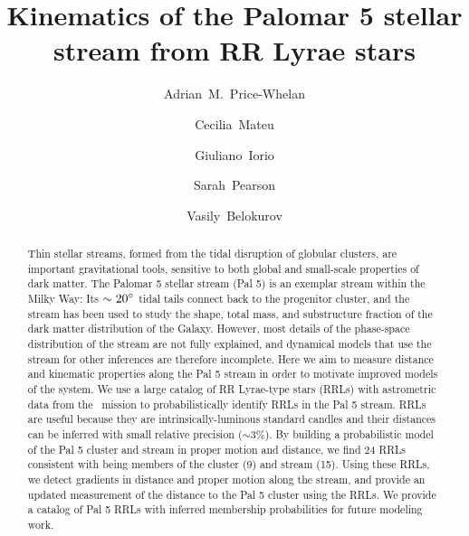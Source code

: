 \documentclass[twocolumn]{aastex63}
\begin{document}
\title{Kinematics of the Palomar 5 stellar stream from RR Lyrae stars}


\author[0000-0003-0872-7098]{Adrian~M.~Price-Whelan}

\author[0000-0002-6330-2394]{Cecilia~Mateu}


\author{Giuliano~Iorio}

\author[0000-0003-0256-5446]{Sarah~Pearson}

\author{Vasily~Belokurov}


\begin{abstract}
Thin stellar streams, formed from the tidal disruption of globular clusters, are important gravitational tools, sensitive to both global and small-scale properties of dark matter.
The Palomar 5 stellar stream (Pal 5) is an exemplar stream within the Milky Way: Its $\sim 20\mbox{$^\circ$}$ tidal tails connect back to the progenitor cluster, and the stream has been used to study the shape, total mass, and substructure fraction of the dark matter distribution of the Galaxy.
However, most details of the phase-space distribution of the stream are not fully explained, and dynamical models that use the stream for other inferences are therefore incomplete.
Here we aim to measure distance and kinematic properties along the Pal 5 stream in order to motivate improved models of the system. %
We use a large catalog of RR Lyrae-type stars (RRLs) with astrometric data from the \Gaia\ mission to probabilistically identify RRLs in the Pal 5 stream.
RRLs are useful because they are intrinsically-luminous standard candles and their distances can be inferred with small relative precision ($\sim3\%$).
By building a probabilistic model of the Pal 5 cluster and stream in proper motion and distance, we find 24 RRLs consistent with being members of the cluster (9) and stream (15).
Using these RRLs, we detect gradients in distance and proper motion along the stream, and provide an updated measurement of the distance to the Pal 5 cluster using the RRLs.
We provide a catalog of Pal 5 RRLs with inferred membership probabilities for future modeling work.
\end{abstract}
\end{document}
